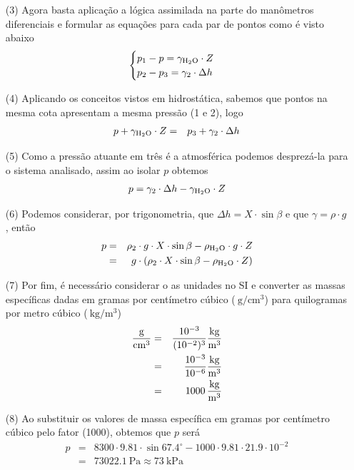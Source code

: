 \documentclass[
	a4paper,
	12pt,
	brazilian
]{article}
\begin{document}
\begin{enumerate}
\begin{center}
		\end{center}
		\item[(3)] Agora basta aplicação a lógica assimilada na parte do manômetros diferenciais e formular as equações para cada par de pontos como é visto abaixo
		$$
		\begin{cases}
			p_{1}-p=\gamma_{\ce{H2O}}\cdot Z\\
			p_{2}-p_{3}=\gamma_{2}\cdot\Delta h
		\end{cases}
		$$
		\item[(4)] Aplicando os conceitos vistos em hidrostática, sabemos que pontos na mesma cota apresentam a mesma pressão (1 e 2), logo
		\begin{eqnarray}
			p+\gamma_{\ce{H2O}}\cdot Z&=&p_{3}+\gamma_{2}\cdot\Delta h
		\end{eqnarray}
		\item[(5)] Como a pressão atuante em três é a atmosférica podemos desprezá-la para o sistema analisado, assim ao isolar $p$ obtemos
		\begin{eqnarray}
			p=\gamma_{2}\cdot\Delta h-\gamma_{\ce{H2O}}\cdot Z
		\end{eqnarray}
		\item[(6)] Podemos considerar, por trigonometria, que $\Delta h=X\cdot\sin\beta$ e que $\gamma=\rho\cdot g$, então
		\begin{eqnarray}
			p&=&\rho_{2}\cdot g\cdot X\cdot\sin\beta-\rho_{\ce{H2O}}\cdot g\cdot Z\\
			&=&g\cdot (\rho_{2}\cdot X\cdot\sin\beta-\rho_{\ce{H2O}}\cdot Z)
		\end{eqnarray}
		\item[(7)] Por fim, é necessário considerar o as unidades no SI e converter as massas específicas dadas em gramas por centímetro cúbico ($\SI{}{\gram/\centi\meter^{3}}$) para quilogramas por metro cúbico ($\SI{}{\kilogram/\meter^{3}}$)
		\begin{eqnarray}
			\SI{}{\dfrac{\gram}{\centi\meter^{3}}}&=&\dfrac{10^{-3}}{(10^{-2})^{3}}\SI{}{\dfrac{\kilogram}{\meter^{3}}}\\
			&=&\dfrac{10^{-3}}{10^{-6}}\SI{}{\dfrac{\kilogram}{\meter^{3}}}\\
			&=&\SI{1000}{\dfrac{\kilogram}{\meter^{3}}}
		\end{eqnarray}
		\item[(8)] Ao substituir os valores de massa específica em gramas por centímetro cúbico pelo fator (1000), obtemos que $p$ será
		\begin{eqnarray}
			p&=&8300\cdot 9.81\cdot\sin 67.4^{\circ}-1000\cdot 9.81\cdot 21.9\cdot 10^{-2}\\
			&=&\SI{73022.1}{\pascal}\approx\SI{73}{\kilo\pascal}
		\end{eqnarray}
	\end{enumerate}
\end{document}
